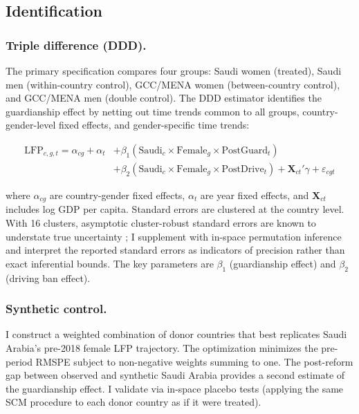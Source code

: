 \documentclass[12pt]{article}
\begin{document}
\subsection{Identification}

\subsubsection*{Triple difference (DDD).} The primary specification compares four groups: Saudi women (treated), Saudi men (within-country control), GCC/MENA women (between-country control), and GCC/MENA men (double control). The DDD estimator identifies the guardianship effect by netting out time trends common to all groups, country-gender-level fixed effects, and gender-specific time trends:

\begin{equation}
\begin{split}
  \text{LFP}_{c,g,t} = \alpha_{cg} + \alpha_t &+ \beta_1 (\text{Saudi}_c \times \text{Female}_g \times \text{PostGuard}_t) \\
  &+ \beta_2 (\text{Saudi}_c \times \text{Female}_g \times \text{PostDrive}_t) + \mathbf{X}_{ct}'\gamma + \varepsilon_{cgt}
\end{split}
  \label{eq:ddd}
\end{equation}

\noindent where $\alpha_{cg}$ are country-gender fixed effects, $\alpha_t$ are year fixed effects, and $\mathbf{X}_{ct}$ includes log GDP per capita. Standard errors are clustered at the country level. With 16 clusters, asymptotic cluster-robust standard errors are known to understate true uncertainty \citep{Bertrand2004}; I supplement with in-space permutation inference and interpret the reported standard errors as indicators of precision rather than exact inferential bounds. The key parameters are $\beta_1$ (guardianship effect) and $\beta_2$ (driving ban effect).

\subsubsection*{Synthetic control.} I construct a weighted combination of donor countries that best replicates Saudi Arabia's pre-2018 female LFP trajectory. The optimization minimizes the pre-period RMSPE subject to non-negative weights summing to one. The post-reform gap between observed and synthetic Saudi Arabia provides a second estimate of the guardianship effect. I validate via in-space placebo tests (applying the same SCM procedure to each donor country as if it were treated).
\end{document}
